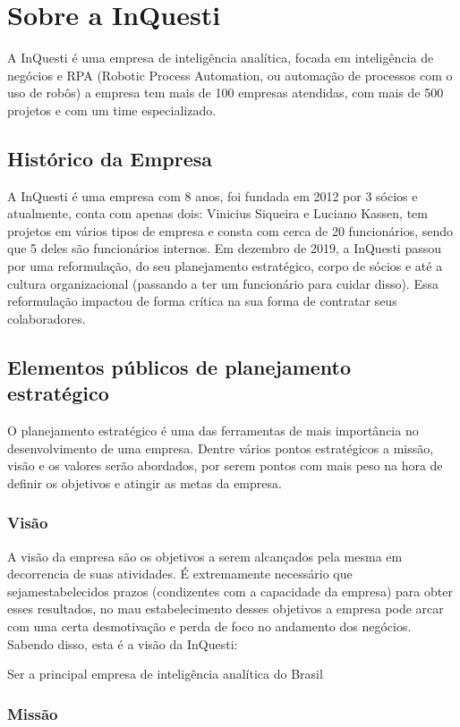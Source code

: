 \chapter{Sobre a InQuesti}
	A InQuesti é uma empresa de inteligência analítica, focada em inteligência de negócios e RPA (Robotic Process Automation, ou automação de processos com o uso de robôs) a empresa tem mais de 100 empresas atendidas, com mais de 500 projetos e com um time especializado. 

\section{Histórico da Empresa}
A InQuesti é uma empresa com 8 anos, foi fundada em 2012 por 3 sócios e atualmente, conta com apenas dois: Vinicius Siqueira e Luciano Kassen, tem projetos em vários tipos de empresa e consta com cerca de 20 funcionários, sendo que 5 deles são funcionários internos. 
Em dezembro de 2019, a InQuesti passou por uma reformulação, do seu planejamento estratégico, corpo de sócios e até a cultura organizacional (passando a ter um funcionário para cuidar disso). Essa reformulação impactou de forma crítica na sua forma de contratar seus colaboradores.

\section{Elementos públicos de planejamento estratégico}
O planejamento estratégico é uma das ferramentas de mais importância no desenvolvimento de uma empresa. Dentre vários pontos estratégicos a missão, visão e os valores serão abordados, por serem pontos com mais peso na hora de definir os objetivos e atingir as metas da empresa.

\subsection{Visão}
A visão da empresa são os objetivos a serem alcançados pela mesma em decorrencia de suas atividades. É extremamente necessário que sejamestabelecidos prazos (condizentes com a capacidade da empresa) para obter esses resultados, no mau estabelecimento desses objetivos a empresa pode arcar com uma certa desmotivação e perda de foco no andamento dos negócios. Sabendo disso, esta é a visão da InQuesti:

Ser a principal empresa de inteligência analítica do Brasil

\subsection{Missão}

